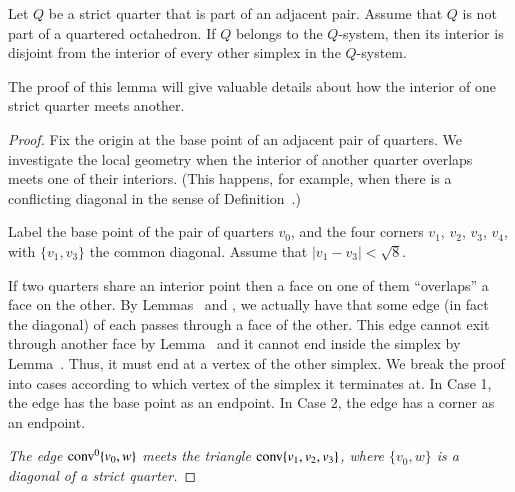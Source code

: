 \begin{tarskidata}
\begin{tarski}

\begin{lemma}
Let $Q$ be a strict quarter that is part of an adjacent pair.
Assume that $Q$ is not part of a quartered octahedron.  If $Q$
belongs to the $Q$-system, then its interior is disjoint from the
interior of every other simplex in the $Q$-system.
\end{lemma}

The proof of this lemma will give valuable details about how the
interior of one strict quarter meets another.

\begin{proof}
Fix the origin at the base point of an adjacent pair of quarters.
We investigate the local geometry when the interior of another
quarter overlaps meets one of their interiors.  (This happens, for
example, when there is a conflicting diagonal in the sense of
Definition~.)

Label the base point of the pair of quarters $v_0$, and the four
corners  $v_1$, $v_2$, $v_3$, $v_4$, with $\{v_1,v_3\}$ the common
diagonal. Assume that $|v_1-v_3|<\sqrt8$.

If two quarters share an interior point then a face on one of them
``overlaps'' a face on the other.  By
Lemmas~ and , we
actually have that some edge (in fact the diagonal) of each passes
through a face of the other.  This edge cannot exit through
another face by Lemma~ and it cannot end
inside the simplex by Lemma~. Thus, it must
end at a vertex of the other simplex.  We break the proof into
cases according to which vertex of the simplex it terminates at.
In Case 1, the edge has the base point as an endpoint.  In Case 2,
the edge has a corner as an endpoint.

 {\it The edge ${\operatorname{conv}}^0\{v_0,w\}$ meets 
the
triangle ${\operatorname{conv}}\{v_1,v_2,v_3\}$, where $\{v_0,w\}$ is a diagonal of a
strict quarter.}


\end{proof}
\end{tarski}
\end{tarskidata}
